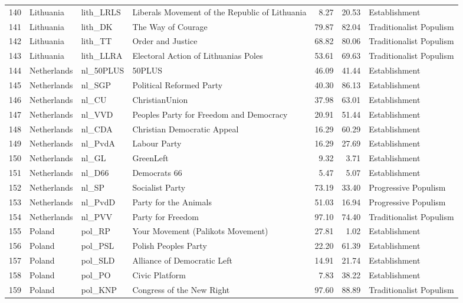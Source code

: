 \begin{landscape}
\begin{longtable}[c]{@{\extracolsep{\fill}}rlllrrl}
  140 & Lithuania & lith\_LRLS & Liberals Movement of the Republic of Lithuania & 8.27 & 20.53 & Establishment \\ 
  141 & Lithuania & lith\_DK & The Way of Courage & 79.87 & 82.04 & Traditionalist Populism \\ 
  142 & Lithuania & lith\_TT & Order and Justice & 68.82 & 80.06 & Traditionalist Populism \\ 
  143 & Lithuania & lith\_LLRA & Electoral Action of Lithuanias Poles & 53.61 & 69.63 & Traditionalist Populism \\ 
  144 & Netherlands & nl\_50PLUS & 50PLUS & 46.09 & 41.44 & Establishment \\ 
  145 & Netherlands & nl\_SGP & Political Reformed Party & 40.30 & 86.13 & Establishment \\ 
  146 & Netherlands & nl\_CU & ChristianUnion & 37.98 & 63.01 & Establishment \\ 
  147 & Netherlands & nl\_VVD & Peoples Party for Freedom and Democracy & 20.91 & 51.44 & Establishment \\ 
  148 & Netherlands & nl\_CDA & Christian Democratic Appeal & 16.29 & 60.29 & Establishment \\ 
  149 & Netherlands & nl\_PvdA & Labour Party & 16.29 & 27.69 & Establishment \\ 
  150 & Netherlands & nl\_GL & GreenLeft & 9.32 & 3.71 & Establishment \\ 
  151 & Netherlands & nl\_D66 & Democrats 66 & 5.47 & 5.07 & Establishment \\ 
  152 & Netherlands & nl\_SP & Socialist Party & 73.19 & 33.40 & Progressive Populism \\ 
  153 & Netherlands & nl\_PvdD & Party for the Animals & 51.03 & 16.94 & Progressive Populism \\ 
  154 & Netherlands & nl\_PVV & Party for Freedom & 97.10 & 74.40 & Traditionalist Populism \\ 
  155 & Poland & pol\_RP & Your Movement (Palikots Movement) & 27.81 & 1.02 & Establishment \\ 
  156 & Poland & pol\_PSL & Polish Peoples Party & 22.20 & 61.39 & Establishment \\ 
  157 & Poland & pol\_SLD & Alliance of Democratic Left & 14.91 & 21.74 & Establishment \\ 
  158 & Poland & pol\_PO & Civic Platform & 7.83 & 38.22 & Establishment \\ 
  159 & Poland & pol\_KNP & Congress of the New Right & 97.60 & 88.89 & Traditionalist Populism \\ 

\end{longtable}
\end{landscape}
